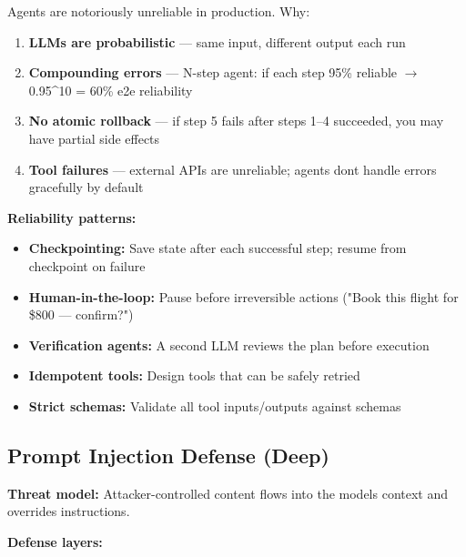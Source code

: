 \documentclass[11pt]{article}
\providecommand{\tightlist}{\setlength{\itemsep}{1pt}\setlength{\parskip}{0pt}}
\begin{document}
Agents are notoriously unreliable in production. Why:

\begin{enumerate}
\def\labelenumi{\arabic{enumi}.}
\tightlist
\item
  \textbf{LLMs are probabilistic} --- same input, different output each run
\item
  \textbf{Compounding errors} --- N-step agent: if each step 95\% reliable \(\rightarrow\) 0.95\^{}10 = 60\% e2e reliability
\item
  \textbf{No atomic rollback} --- if step 5 fails after steps 1--4 succeeded, you may have partial side effects
\item
  \textbf{Tool failures} --- external APIs are unreliable; agents don\textquotesingle t handle errors gracefully by default
\end{enumerate}

\textbf{Reliability patterns:}

\begin{itemize}
\tightlist
\item
  \textbf{Checkpointing:} Save state after each successful step; resume from checkpoint on failure
\item
  \textbf{Human-in-the-loop:} Pause before irreversible actions ("Book this flight for \$800 --- confirm?")
\item
  \textbf{Verification agents:} A second LLM reviews the plan before execution
\item
  \textbf{Idempotent tools:} Design tools that can be safely retried
\item
  \textbf{Strict schemas:} Validate all tool inputs/outputs against schemas
\end{itemize}

\subsection{Prompt Injection Defense (Deep)}\label{prompt-injection-defense-deep}

\textbf{Threat model:} Attacker-controlled content flows into the model\textquotesingle s context and overrides instructions.

\textbf{Defense layers:}
\end{document}
